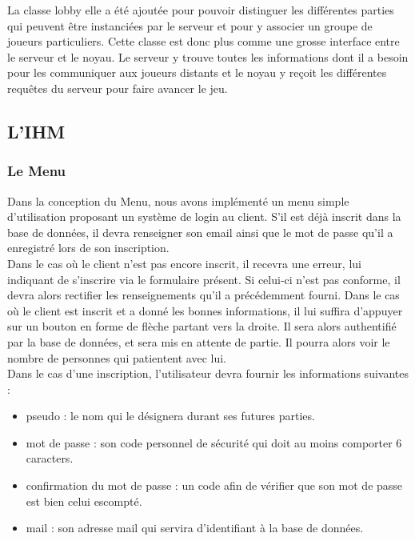 \documentclass[a4paper,11pt]{article}
\begin{document}
	La classe lobby elle a été ajoutée pour pouvoir distinguer les différentes parties qui peuvent être instanciées par le serveur et pour y associer un groupe de joueurs particuliers. Cette classe est donc plus comme une grosse interface entre le serveur et le noyau. Le serveur y trouve toutes les informations dont il a besoin pour les communiquer aux joueurs distants et le noyau y reçoit les différentes requêtes du serveur pour faire avancer le jeu.  \\
	


\subsection{L'IHM}


\subsubsection{Le Menu}

	Dans la conception du Menu, nous avons implémenté un menu simple d’utilisation
proposant un système de login au client. S’il est déjà inscrit dans la base de données, il devra renseigner son email ainsi que le mot de passe qu’il a enregistré lors de son inscription. \\

Dans le cas où le client n’est pas encore inscrit, il recevra une erreur, lui indiquant de s’inscrire via le formulaire présent. Si celui-ci n’est pas conforme, il devra alors rectifier les renseignements qu’il a précédemment fourni. Dans le cas où le client est inscrit et a donné les bonnes informations, il lui suffira d’appuyer sur un bouton en forme de flèche partant vers la droite. Il sera alors authentifié par la base de données, et sera mis en attente de partie. Il pourra alors voir le nombre de personnes qui patientent avec lui. \\

	Dans le cas d’une inscription, l’utilisateur devra fournir les informations suivantes :

\begin{itemize}
	\item pseudo : le nom qui le désignera durant ses futures parties.
	\item mot de passe : son code personnel de sécurité qui doit au moins comporter 6 caracters.
	\item confirmation du mot de passe : un code afin de vérifier que son mot de passe est bien celui escompté.
	\item mail : son adresse mail qui servira d’identifiant à la base de données. 	 \\
\end{itemize}
\end{document}
